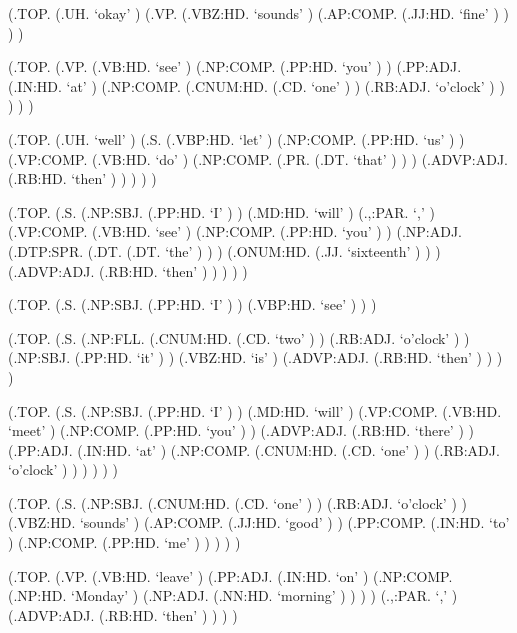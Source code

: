 \documentclass[10pt]{article}
\begin{document}
\begin{parsetree}  (.TOP. (.UH. `okay' ) (.VP. (.VBZ:HD. `sounds' ) (.AP:COMP. (.JJ:HD. `fine' ) ) ) ) \end{parsetree}

\begin{parsetree}  (.TOP. (.VP. (.VB:HD. `see' ) (.NP:COMP. (.PP:HD. `you' ) ) (.PP:ADJ. (.IN:HD. `at' ) (.NP:COMP. (.CNUM:HD. (.CD. `one' ) ) (.RB:ADJ. `o'clock' ) ) ) ) ) \end{parsetree}

\begin{parsetree}  (.TOP. (.UH. `well' ) (.S. (.VBP:HD. `let' ) (.NP:COMP. (.PP:HD. `us' ) ) (.VP:COMP. (.VB:HD. `do' ) (.NP:COMP. (.PR. (.DT. `that' ) ) ) (.ADVP:ADJ. (.RB:HD. `then' ) ) ) ) ) \end{parsetree}

\begin{parsetree}  (.TOP. (.S. (.NP:SBJ. (.PP:HD. `I' ) ) (.MD:HD. `will' ) (.,:PAR. `,' ) (.VP:COMP. (.VB:HD. `see' ) (.NP:COMP. (.PP:HD. `you' ) ) (.NP:ADJ. (.DTP:SPR. (.DT. (.DT. `the' ) ) ) (.ONUM:HD. (.JJ. `sixteenth' ) ) ) (.ADVP:ADJ. (.RB:HD. `then' ) ) ) ) ) \end{parsetree}

\begin{parsetree}  (.TOP. (.S. (.NP:SBJ. (.PP:HD. `I' ) ) (.VBP:HD. `see' ) ) ) \end{parsetree}

\begin{parsetree}  (.TOP. (.S. (.NP:FLL. (.CNUM:HD. (.CD. `two' ) ) (.RB:ADJ. `o'clock' ) ) (.NP:SBJ. (.PP:HD. `it' ) ) (.VBZ:HD. `is' ) (.ADVP:ADJ. (.RB:HD. `then' ) ) ) ) \end{parsetree}

\begin{parsetree}  (.TOP. (.S. (.NP:SBJ. (.PP:HD. `I' ) ) (.MD:HD. `will' ) (.VP:COMP. (.VB:HD. `meet' ) (.NP:COMP. (.PP:HD. `you' ) ) (.ADVP:ADJ. (.RB:HD. `there' ) ) (.PP:ADJ. (.IN:HD. `at' ) (.NP:COMP. (.CNUM:HD. (.CD. `one' ) ) (.RB:ADJ. `o'clock' ) ) ) ) ) ) \end{parsetree}

\begin{parsetree}  (.TOP. (.S. (.NP:SBJ. (.CNUM:HD. (.CD. `one' ) ) (.RB:ADJ. `o'clock' ) ) (.VBZ:HD. `sounds' ) (.AP:COMP. (.JJ:HD. `good' ) ) (.PP:COMP. (.IN:HD. `to' ) (.NP:COMP. (.PP:HD. `me' ) ) ) ) ) \end{parsetree}

\begin{parsetree}  (.TOP. (.VP. (.VB:HD. `leave' ) (.PP:ADJ. (.IN:HD. `on' ) (.NP:COMP. (.NP:HD. `Monday' ) (.NP:ADJ. (.NN:HD. `morning' ) ) ) ) (.,:PAR. `,' ) (.ADVP:ADJ. (.RB:HD. `then' ) ) ) ) \end{parsetree}
\end{document}
